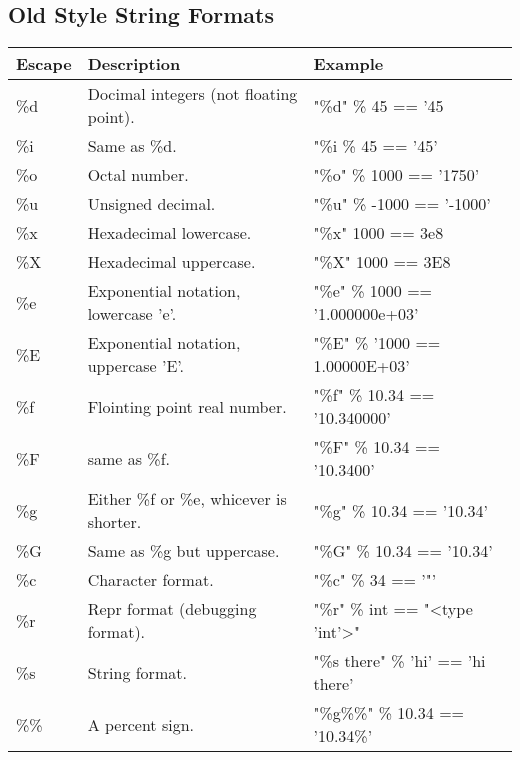 \documentclass[12pt]{article}
\begin{document}
\subsection{Old Style String Formats}
\begin{tabular}{|l|l|l|}
	\hline
	\textbf{Escape} & \textbf{Description} & \textbf{Example}\\ \hline
	\%d & Docimal integers (not floating point). & "\%d" \% 45 == '45\\
	\%i & Same as \%d. & "\%i \% 45 == '45'\\
	\%o & Octal number. & "\%o" \% 1000 == '1750'\\
	\%u & Unsigned decimal. & "\%u" \% -1000 == '-1000'\\
	\%x & Hexadecimal lowercase. & "\%x" 1000 == 3e8\\
	\%X & Hexadecimal uppercase. & "\%X" 1000 == 3E8\\
	\%e & Exponential notation, lowercase 'e'. & "\%e" \% 1000 == '1.000000e+03'\\
	\%E & Exponential notation, uppercase 'E'. & "\%E" \% '1000 == 1.00000E+03'\\
	\%f & Flointing point real number. & "\%f" \% 10.34 == '10.340000'\\
	\%F & same as \%f. & "\%F" \% 10.34 == '10.3400'\\
	\%g & Either \%f or \%e, whicever is shorter. & "\%g" \% 10.34 == '10.34'\\
	\%G & Same as \%g but uppercase. & "\%G" \% 10.34 == '10.34'\\
	\%c & Character format. & "\%c" \% 34 == '"'\\
	\%r & Repr format (debugging format). & "\%r" \% int == "\textless type 'int'\textgreater "\\
	\%s & String format. & "\%s there" \% 'hi' == 'hi there'\\
	\%\% & A percent sign. & "\%g\%\%" \% 10.34 == '10.34\%'\\
	
	
	\hline
\end{tabular}
\end{document}
